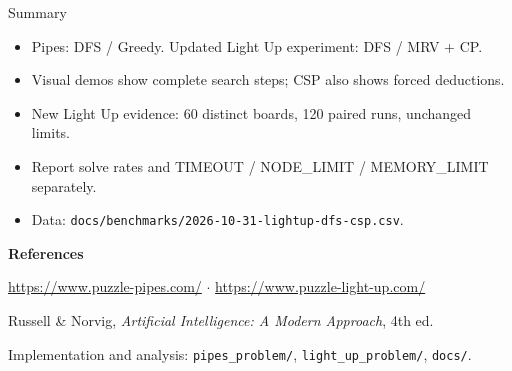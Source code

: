 \documentclass[aspectratio=169,11pt]{beamer}
\begin{document}
\begin{frame}{Summary}
\begin{itemize}
\item Pipes: DFS / Greedy. Updated Light Up experiment: DFS / MRV + CP.
\item Visual demos show complete search steps; CSP also shows forced deductions.
\item New Light Up evidence: 60 distinct boards, 120 paired runs, unchanged limits.
\item Report solve rates and TIMEOUT / NODE\_LIMIT / MEMORY\_LIMIT separately.
\item Data: \texttt{docs/benchmarks/2026-10-31-lightup-dfs-csp.csv}.
\end{itemize}
\vspace{5mm}
\small\textbf{References}\par\vspace{2mm}
\url{https://www.puzzle-pipes.com/} $\cdot$ \url{https://www.puzzle-light-up.com/}\par
Russell \& Norvig, \emph{Artificial Intelligence: A Modern Approach}, 4th ed.\par
Implementation and analysis: \texttt{pipes\_problem/}, \texttt{light\_up\_problem/}, \texttt{docs/}.
\end{frame}
\end{document}
